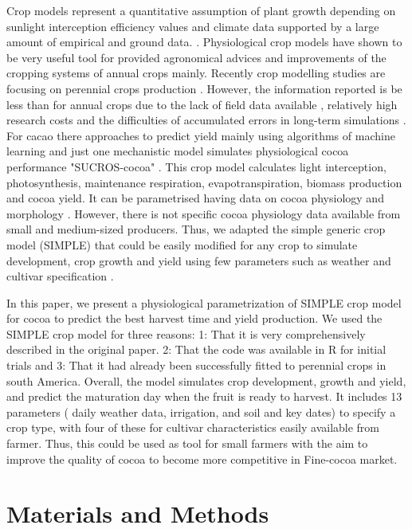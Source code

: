 \documentclass[gene,journal,article,submit,moreauthors,pdftex]{Definitions/mdpi}
\begin{document}
Crop models represent a quantitative assumption of plant growth depending on sunlight interception efficiency values and climate data supported by a large amount of empirical and ground data. \citep{Reynolds2018}. Physiological crop models have shown to be very useful tool for provided agronomical advices and improvements of the cropping systems of annual crops mainly. Recently crop modelling studies are focusing on  perennial crops  production \citep{zuidema2005, Zao2019simple, Bai2020, Romero2021}. However, the information reported  is be less than for annual crops due to the lack of field data available , relatively high research costs and the difficulties of accumulated errors in long-term simulations \citep{zuidema2005}. For cacao there  approaches  to predict yield mainly  using algorithms of machine learning \citep{lamos2020} and just one mechanistic model simulates physiological cocoa performance  "SUCROS-cocoa" \citep{zuidema2005}. This crop model calculates light interception, photosynthesis, maintenance respiration,
evapotranspiration, biomass production and cocoa yield. It can be parametrised having data on cocoa physiology and morphology \citep{zuidema2005}. However,  there is not specific cocoa physiology data available from small and medium-sized producers. Thus, we adapted the simple generic crop model (SIMPLE) that could be easily modified for any crop to simulate development, crop growth and yield using few parameters such as weather and cultivar specification \citep{Zao2019simple}.

In this paper, we present a physiological parametrization of SIMPLE crop model for cocoa to predict the best harvest time  and yield production. We used the SIMPLE crop model \citep{Zao2019simple} for three reasons: 1: That it is very comprehensively described in the original paper. 2: That the code was available in R for initial trials and 3: That it had already been successfully fitted to perennial crops in south America. Overall, the model simulates crop development, growth and yield, and predict the maturation day when the fruit is ready to harvest. It includes 13 parameters ( daily weather data, irrigation, and soil and key dates) to specify a crop type, with four of these for cultivar characteristics easily available from farmer. Thus, this could be used as  tool for small farmers with the aim to improve the quality of cocoa to become more competitive in Fine-cocoa market.
 
\section{Materials and Methods}
\end{document}
